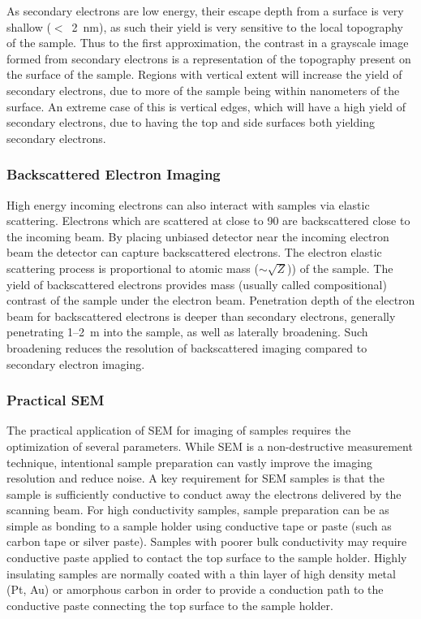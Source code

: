 As secondary electrons are low energy, their escape depth from a surface is very shallow (\(<\)~2~nm), as such their yield is very sensitive to the local topography of the sample.
Thus to the first approximation, the contrast in a grayscale image formed from secondary electrons is a representation of the topography present on the surface of the sample.
Regions with vertical extent will increase the yield of secondary electrons, due to more of the sample being within nanometers of the surface.
An extreme case of this is vertical edges, which will have a high yield of secondary electrons, due to having the top and side surfaces both yielding secondary electrons.

\subsubsection{Backscattered Electron Imaging} High energy incoming electrons can also interact with samples via elastic scattering.
Electrons which are scattered at close to 90\degree{} are backscattered close to the incoming beam.
By placing unbiased detector near the incoming electron beam the detector can capture backscattered electrons.
The electron elastic scattering process is proportional to atomic mass (\(\sim\)\(\sqrt{Z}\))) of the sample.
The yield of backscattered electrons provides mass (usually called compositional) contrast of the sample under the electron beam.
Penetration depth of the electron beam for backscattered electrons is deeper than secondary electrons, generally penetrating 1--2~\micro{}m into the sample, as well as laterally broadening.
Such broadening reduces the resolution of backscattered imaging compared to secondary electron imaging.

\subsubsection{Practical SEM} The practical application of SEM for imaging of samples requires the optimization of several parameters.
While SEM is a non-destructive measurement technique, intentional sample preparation can vastly improve the imaging resolution and reduce noise.
A key requirement for SEM samples is that the sample is sufficiently conductive to conduct away the electrons delivered by the scanning beam.
For high conductivity samples, sample preparation can be as simple as bonding to a sample holder using conductive tape or paste (such as carbon tape or silver paste).
Samples with poorer bulk conductivity may require conductive paste applied to contact the top surface to the sample holder.
Highly insulating samples are normally coated with a thin layer of high density metal (Pt, Au) or amorphous carbon in order to provide a conduction path to the conductive paste connecting the top surface to the sample holder.

